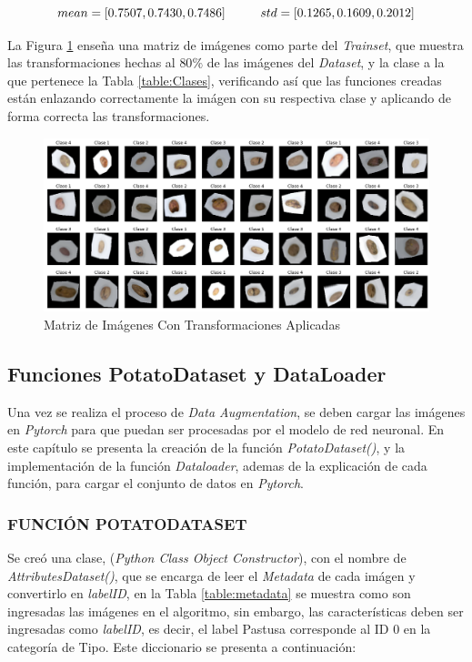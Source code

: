 \begin{equation}
	{mean = [0.7507, 0.7430, 0.7486] \hspace*{1cm}  std  = [0.1265, 0.1609, 0.2012]}
	\label{eq:meanstd2}
\end{equation}

La Figura \ref{fig:agumentation} enseña una matriz de imágenes como parte del \textit{Trainset}, que muestra las transformaciones hechas al $80\%$ de las imágenes del \textit{Dataset}, y la clase a la que pertenece la Tabla \ref{table:Clases}, verificando así que las funciones creadas están enlazando correctamente la imágen con su respectiva clase y aplicando de forma correcta las transformaciones.


\begin{figure}[ht]
	\centering
	\includegraphics[scale=0.4]{Figs/augmentation.png}
	\caption{Matriz de Imágenes Con Transformaciones Aplicadas}
	\label{fig:agumentation}
\end{figure}	

\subsection{Funciones PotatoDataset y DataLoader}

Una vez se realiza el proceso de \textit{Data Augmentation}, se deben cargar las imágenes en \textit{Pytorch} para que puedan ser procesadas por el modelo de red neuronal. En este capítulo se presenta la creación de la función \textit{PotatoDataset()}, y la implementación de la función \textit{Dataloader}, ademas de la explicación de cada función, para cargar el conjunto de datos en \textit{Pytorch}.


\subsubsection{FUNCIÓN POTATODATASET}

Se creó una clase, (\textit{Python Class Object Constructor}), con el nombre de \textit{AttributesDataset()}, que se encarga de leer el \textit{Metadata}  de cada imágen y convertirlo en \textit{labelID}, en la Tabla \ref{table:metadata} se muestra como son ingresadas las imágenes en el algoritmo, sin embargo, las características deben ser ingresadas como \textit{labelID}, es decir, el label Pastusa corresponde al ID 0 en la categoría de Tipo. Este diccionario se presenta a continuación:			

